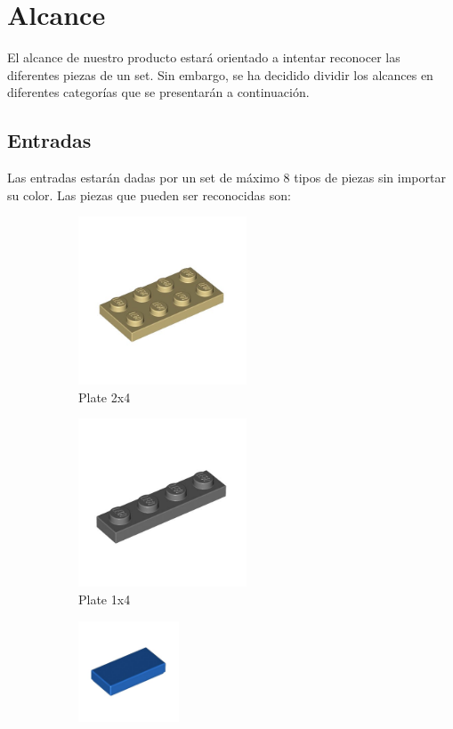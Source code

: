 \documentclass[letterpaper]{scrreprt}
\begin{document}
\chapter{Alcance}
El alcance de nuestro producto estará orientado a intentar reconocer las diferentes piezas de un set. Sin embargo, se ha decidido dividir los alcances en diferentes categorías que se presentarán a continuación.

\section{Entradas}
Las entradas estarán dadas por un set de máximo 8 tipos de piezas sin importar su color. Las piezas que pueden ser reconocidas son:

\begin{figure}[H]
	\begin{subfigure}{0.5\textwidth}
		\includegraphics[width=0.9\linewidth, height=5cm]{Bricks/plate2x4.jpeg} 
		\caption{Plate 2x4}
		\label{fig:subim1}
	\end{subfigure}
	\begin{subfigure}{0.5\textwidth}
		\includegraphics[width=0.9\linewidth, height=5cm]{Bricks/plate1x4.jpeg}
		\caption{Plate 1x4}
		\label{fig:subim2}
	\end{subfigure}
	\begin{subfigure}{0.5\textwidth}
		\centering
		\includegraphics[width=0.4\linewidth, height=3cm]{Bricks/flattile1x2.jpeg}

\end{subfigure}
\end{figure}
\end{document}
